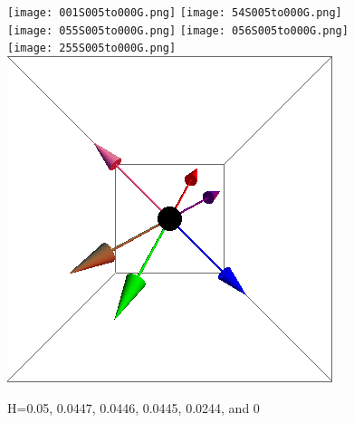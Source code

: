 \documentclass{article}
\begin{document}
\begin{figure}[ht]
\centering
\texttt{[image: 001S005to000G.png]}
\texttt{[image: 54S005to000G.png]}
\texttt{[image: 055S005to000G.png]}
\texttt{[image: 056S005to000G.png]}
\texttt{[image: 255S005to000G.png]}
\includegraphics[scale=0.27]{501S005to000G.png}
\caption{H=0.05, 0.0447, 0.0446, 0.0445, 0.0244, and 0}
\end{figure}
\end{document}
